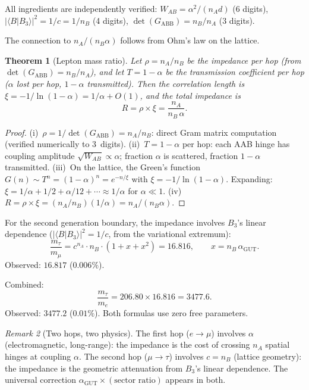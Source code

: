 \documentclass[12pt]{article}
\newtheorem{theorem}{Theorem}[section]
\theoremstyle{remark}
\newtheorem{remark}[theorem]{Remark}
\theoremstyle{definition}
\begin{document}
All ingredients are independently verified: $W_{AB} = \alpha^2/(n_A d)$ (6 digits), $|\langle B|B_3\rangle|^2 = 1/c = 1/n_B$ (4 digits), $\det(G_\mathrm{ABB}) = n_B/n_A$ (3 digits).

The connection to $n_A/(n_B\alpha)$ follows from Ohm's law on the lattice.

\begin{theorem}[Lepton mass ratio]
\label{thm:lepton_mass}
Let $\rho = n_A/n_B$ be the impedance per hop (from $\det(G_\mathrm{ABB}) = n_B/n_A$), and let $T = 1 - \alpha$ be the transmission coefficient per hop ($\alpha$ lost per hop, $1-\alpha$ transmitted).  Then the correlation length is $\xi = -1/\ln(1-\alpha) = 1/\alpha + O(1)$, and the total impedance is
\begin{equation}
R = \rho \times \xi = \frac{n_A}{n_B\,\alpha}.
\end{equation}
\end{theorem}

\begin{proof}
(i)~$\rho = 1/\det(G_\mathrm{ABB}) = n_A/n_B$: direct Gram matrix computation (verified numerically to 3~digits). (ii)~$T = 1 - \alpha$ per hop: each AAB hinge has coupling amplitude $\sqrt{W_{AB}} \propto \alpha$; fraction $\alpha$ is scattered, fraction $1-\alpha$ transmitted. (iii)~On the lattice, the Green's function $G(n) \sim T^n = (1-\alpha)^n = e^{-n/\xi}$ with $\xi = -1/\ln(1-\alpha)$.  Expanding: $\xi = 1/\alpha + 1/2 + \alpha/12 + \cdots \approx 1/\alpha$ for $\alpha \ll 1$. (iv)~$R = \rho \times \xi = (n_A/n_B)(1/\alpha) = n_A/(n_B\alpha)$.
\end{proof}

For the second generation boundary, the impedance involves $B_3$'s linear dependence ($|\langle B|B_3\rangle|^2 = 1/c$, from the variational extremum):
\begin{equation}
\label{eq:tau_mu}
\boxed{\frac{m_\tau}{m_\mu} = c^{n_A}\cdot n_B \cdot \left(1 + x + x^2\right) = 16.816, \qquad x = n_B\,\alpha_\mathrm{GUT}.}
\end{equation}
Observed: $16.817$ ($0.006\%$).

Combined:
\begin{equation}
\label{eq:tau_e}
\frac{m_\tau}{m_e} = 206.80 \times 16.816 = 3477.6.
\end{equation}
Observed: $3477.2$ ($0.01\%$).  Both formulas use zero free parameters.

\begin{remark}[Two hops, two physics]
The first hop ($e \to \mu$) involves $\alpha$ (electromagnetic, long-range): the impedance is the cost of crossing $n_A$ spatial hinges at coupling $\alpha$.  The second hop ($\mu \to \tau$) involves $c = n_B$ (lattice geometry): the impedance is the geometric attenuation from $B_3$'s linear dependence.  The universal correction $\alpha_\mathrm{GUT} \times (\text{sector ratio})$ appears in both.
\end{remark}
\end{document}
